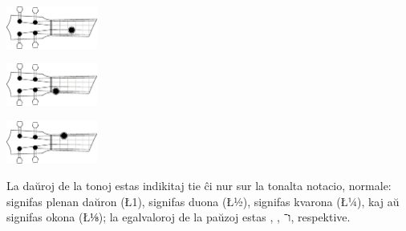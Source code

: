 \vspace{\baselineskip}
\begin{minipage}{4cm}
	\centering
	\includegraphics[width=3cm]{../plano-C3.eps}\\
\end{minipage}\hfill
\begin{minipage}{4cm}
	\centering
	\includegraphics[width=3cm]{../plano-G1.eps}\\
\end{minipage}\hfill
\begin{minipage}{4cm}
	\centering
	\includegraphics[width=3cm]{../plano-A2.eps}\\
\end{minipage}
\vspace{\baselineskip}

La daŭroj de la tonoj estas indikitaj tie ĉi nur sur la tonalta notacio, normale:  signifas plenan daŭron (\L{1}),  signifas duona (\L{½}),  signifas kvarona (\L{¼}), kaj  aŭ  signifas okona (\L{⅛}); la egalvaloroj de la paŭzoj estas , ,  ו־, respektive.

